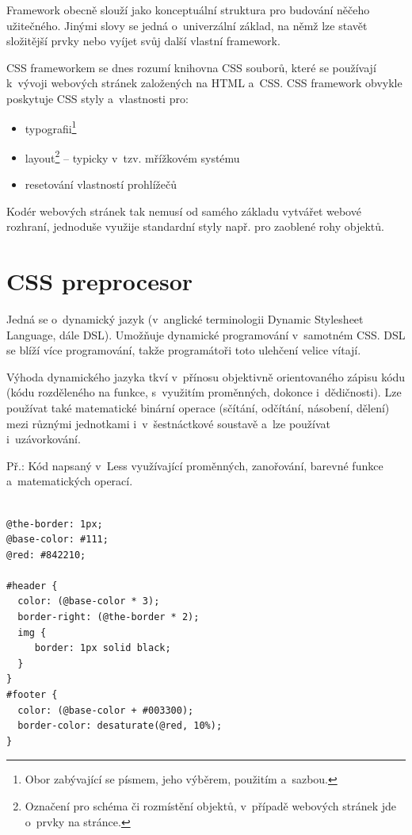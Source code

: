\documentclass[thesis=B,czech]{FITthesis}[2012/06/26]
\begin{document}
Framework obecně slouží jako konceptuální struktura pro budování něčeho užitečného. Jinými slovy se jedná o~univerzální základ, na němž lze stavět složitější prvky nebo vyíjet svůj další vlastní framework. 

CSS frameworkem se dnes rozumí knihovna CSS souborů, které se používají k~vývoji webových stránek založených na HTML a~CSS. CSS framework obvykle poskytuje CSS styly a~vlastnosti pro:

\begin{itemize}
 \item typografii\footnote{Obor zabývající se písmem, jeho výběrem, použitím a~sazbou.}
 \item layout\footnote{Označení pro schéma či rozmístění objektů, v~případě webových stránek jde o~prvky na stránce.} -- typicky v~tzv. mřížkovém systému
 \item resetování vlastností prohlížečů\cite{fram}
\end{itemize}
Kodér webových stránek tak nemusí od samého základu vytvářet webové rozhraní, jednoduše využije standardní styly např. pro zaoblené rohy objektů. 

\section{CSS preprocesor}

Jedná se o~dynamický jazyk (v~anglické terminologii Dynamic Stylesheet Language, dále DSL). Umožňuje dynamické programování v~samotném CSS. DSL se blíží více programování, takže programátoři toto ulehčení velice vítají.

Výhoda dynamického jazyka tkví v~přínosu objektivně orientovaného zápisu kódu (kódu rozděleného na funkce, s~využitím proměnných, dokonce i~dědičnosti). Lze používat také matematické binární operace (sčítání, odčítání, násobení, dělení) mezi různými jednotkami i~v~šestnáctkové soustavě a~lze používat i~uzávorkování. 


\noindent Př.: Kód napsaný v~Less využívající proměnných, zanořování, barevné funkce a~matematických operací.
\scriptsize
\begin{verbatim}

@the-border: 1px;
@base-color: #111;
@red: #842210;

#header {
  color: (@base-color * 3);
  border-right: (@the-border * 2);
  img {
     border: 1px solid black;  
  }
}
#footer {
  color: (@base-color + #003300);
  border-color: desaturate(@red, 10%);
}
\end{verbatim}
\normalsize
\end{document}
